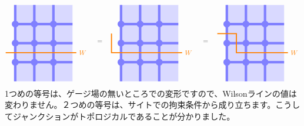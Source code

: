 \documentclass[report,paper=a4, fontsize=12pt, line_length=16cm, number_of_lines=33,dvipdfmx]{jlreq}
\numberwithin{equation}{chapter}
\begin{document}
\begin{align}
  \begin{tikzpicture}[baseline=0cm]
      \foreach \x in {0,1,2}{
          \foreach \y in {-2,-1,...,1}{
          \fill[plaqblue](\x,\y) rectangle (\x+1,\y+1);
          }
      }
      \foreach \x in {0,1,2}{
          \foreach \y in {-1,0,1}{
              \fill[linkblue] (\x,\y) circle (1.8mm);
          }
      }
      \foreach \x in {0,1,2}{
          \foreach \y in {-1,0,1}{
              \draw[linkblue, line width = 1.3mm](\x,\y)--(\x + 1,\y);
          }
      }
      \foreach \x in {0,1,2}{
          \foreach \y in {-2,-1,...,1}{
              \draw[linkblue, line width = 1.3mm](\x,\y)--(\x,\y + 1);
          }
      }
      \draw[red!50!yellow, ultra thick](-0.5,-0.5)--(3.2,-0.5) node[right]{$W$};
  \end{tikzpicture}
  \quad
  =\quad
  \begin{tikzpicture}[baseline=0cm]
      \foreach \x in {0,1,2}{
          \foreach \y in {-2,-1,...,1}{
          \fill[plaqblue](\x,\y) rectangle (\x+1,\y+1);
          }
      }
      \foreach \x in {0,1,2}{
          \foreach \y in {-1,0,1}{
              \fill[linkblue] (\x,\y) circle (1.8mm);
          }
      }
      \foreach \x in {0,1,2}{
          \foreach \y in {-1,0,1}{
              \draw[linkblue, line width = 1.3mm](\x,\y)--(\x + 1,\y);
          }
      }
      \foreach \x in {0,1,2}{
          \foreach \y in {-2,-1,...,1}{
              \draw[linkblue, line width = 1.3mm](\x,\y)--(\x,\y + 1);
          }
      }
      \draw[red!50!yellow, ultra thick](-0.5, 0.5)--(-0.5,-0.5)--(3.2,-0.5) node[right]{$W$};
  \end{tikzpicture}
  \quad
  =\quad
  \begin{tikzpicture}[baseline=0cm]
      \foreach \x in {0,1,2}{
          \foreach \y in {-2,-1,...,1}{
          \fill[plaqblue](\x,\y) rectangle (\x+1,\y+1);
          }
      }
      \foreach \x in {0,1,2}{
          \foreach \y in {-1,0,1}{
              \fill[linkblue] (\x,\y) circle (1.8mm);
          }
      }
      \foreach \x in {0,1,2}{
          \foreach \y in {-1,0,1}{
              \draw[linkblue, line width = 1.3mm](\x,\y)--(\x + 1,\y);
          }
      }
      \foreach \x in {0,1,2}{
          \foreach \y in {-2,-1,...,1}{
              \draw[linkblue, line width = 1.3mm](\x,\y)--(\x,\y + 1);
          }
      }
      \draw[red!50!yellow, ultra thick](-0.5, 0.5)--(0.5, 0.5)--(0.5,-0.5)--(3.2,-0.5) node[right]{$W$};
  \end{tikzpicture}
\end{align}
1つめの等号は、ゲージ場の無いところでの変形ですので、Wilsonラインの値は変わりません。２つめの等号は、サイトでの拘束条件から成り立ちます。こうしてジャンクションがトポロジカルであることが分かりました。
\end{document}
